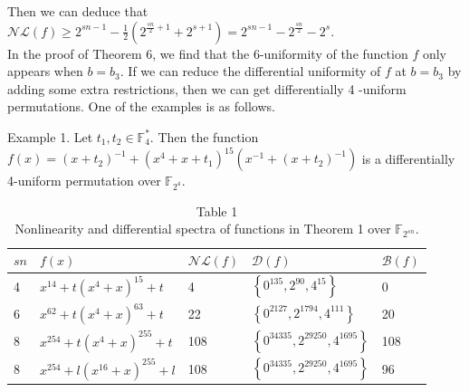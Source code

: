 \documentclass[10pt]{article}
\begin{document}
Then we can deduce that $\mathcal{N} \mathcal{L}(f) \geqslant 2^{s n-1}-\frac{1}{2}\left(2^{\frac{s n}{2}+1}+2^{s+1}\right)=2^{s n-1}-2^{\frac{s n}{2}}-2^{s}$.\\
In the proof of Theorem 6, we find that the 6-uniformity of the function $f$ only appears when $b=b_{3}$. If we can reduce the differential uniformity of $f$ at $b=b_{3}$ by adding some extra restrictions, then we can get differentially 4 -uniform permutations. One of the examples is as follows.

Example 1. Let $t_{1}, t_{2} \in \mathbb{F}_{4}^{*}$. Then the function $f(x)=\left(x+t_{2}\right)^{-1}+\left(x^{4}+x+t_{1}\right)^{15}\left(x^{-1}+\left(x+t_{2}\right)^{-1}\right)$ is a differentially 4-uniform permutation over $\mathbb{F}_{2^{4}}$.

\begin{table}[h]
\begin{center}
\captionsetup{labelformat=empty}
\caption{Table 1\\
Nonlinearity and differential spectra of functions in Theorem 1 over $\mathbb{F}_{2^{s n}}$.}
\begin{tabular}{|l|l|l|l|l|}
\hline
$s n$ & $f(x)$ & $\mathcal{N} \mathcal{L}(f)$ & $\mathcal{D}(f)$ & $\mathcal{B}(f)$ \\
\hline
4 & $x^{14}+t\left(x^{4}+x\right)^{15}+t$ & 4 & $\left\{0^{135}, 2^{90}, 4^{15}\right\}$ & 0 \\
\hline
6 & $x^{62}+t\left(x^{4}+x\right)^{63}+t$ & 22 & $\left\{0^{2127}, 2^{1794}, 4^{111}\right\}$ & 20 \\
\hline
8 & $x^{254}+t\left(x^{4}+x\right)^{255}+t$ & 108 & $\left\{0^{34335}, 2^{29250}, 4^{1695}\right\}$ & 108 \\
\hline
8 & $x^{254}+l\left(x^{16}+x\right)^{255}+l$ & 108 & $\left\{0^{34335}, 2^{29250}, 4^{1695}\right\}$ & 96 \\
\hline
\end{tabular}
\end{center}
\end{table}
\end{document}
